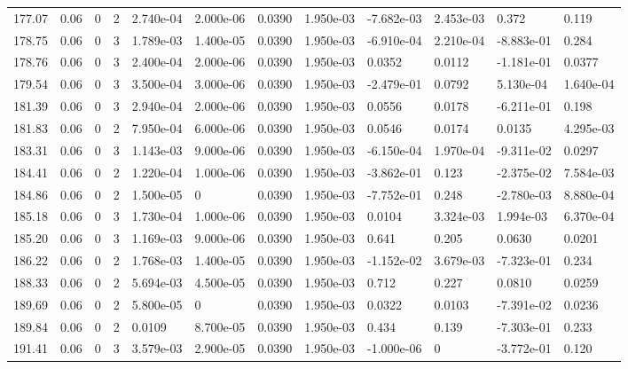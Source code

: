 \documentclass[preview]{standalone}
\begin{document}
{{{{{{{\begin{tabular}{L{1.2cm}C{1.2cm} C{0.3cm}C{0.5cm} C{1.4cm}C{1.4cm} C{1.4cm}C{1.4cm} C{1.6cm}C{1.6cm} C{1.6cm}C{1.6cm}}
  177.07  &  0.06  & 0     &  2 &  2.740e-04  & 2.000e-06  &  0.0390&   1.950e-03& -7.682e-03 & 2.453e-03   &  0.372 & 0.119  \\ 
  178.75  &  0.06  & 0     &  3 &  1.789e-03  & 1.400e-05  &  0.0390&   1.950e-03& -6.910e-04 & 2.210e-04   &  -8.883e-01 & 0.284  \\ 
  178.76  &  0.06  & 0     &  3 &  2.400e-04  & 2.000e-06  &  0.0390&   1.950e-03& 0.0352 & 0.0112   &  -1.181e-01 & 0.0377  \\ 
  179.54  &  0.06  & 0     &  3 &  3.500e-04  & 3.000e-06  &  0.0390&   1.950e-03& -2.479e-01 & 0.0792   &  5.130e-04 & 1.640e-04  \\ 
  181.39  &  0.06  & 0     &  3 &  2.940e-04  & 2.000e-06  &  0.0390&   1.950e-03& 0.0556 & 0.0178   &  -6.211e-01 & 0.198  \\ 
  181.83  &  0.06  & 0     &  2 &  7.950e-04  & 6.000e-06  &  0.0390&   1.950e-03& 0.0546 & 0.0174   &  0.0135 & 4.295e-03  \\ 
  183.31  &  0.06  & 0     &  3 &  1.143e-03  & 9.000e-06  &  0.0390&   1.950e-03& -6.150e-04 & 1.970e-04   &  -9.311e-02 & 0.0297  \\ 
  184.41  &  0.06  & 0     &  2 &  1.220e-04  & 1.000e-06  &  0.0390&   1.950e-03& -3.862e-01 & 0.123   &  -2.375e-02 & 7.584e-03  \\ 
  184.86  &  0.06  & 0     &  2 &  1.500e-05  & 0  &  0.0390&   1.950e-03& -7.752e-01 & 0.248   &  -2.780e-03 & 8.880e-04  \\ 
  185.18  &  0.06  & 0     &  3 &  1.730e-04  & 1.000e-06  &  0.0390&   1.950e-03& 0.0104 & 3.324e-03   &  1.994e-03 & 6.370e-04  \\ 
  185.20  &  0.06  & 0     &  3 &  1.169e-03  & 9.000e-06  &  0.0390&   1.950e-03& 0.641 & 0.205   &  0.0630 & 0.0201  \\ 
  186.22  &  0.06  & 0     &  2 &  1.768e-03  & 1.400e-05  &  0.0390&   1.950e-03& -1.152e-02 & 3.679e-03   &  -7.323e-01 & 0.234  \\ 
  188.33  &  0.06  & 0     &  2 &  5.694e-03  & 4.500e-05  &  0.0390&   1.950e-03& 0.712 & 0.227   &  0.0810 & 0.0259  \\ 
  189.69  &  0.06  & 0     &  2 &  5.800e-05  & 0  &  0.0390&   1.950e-03& 0.0322 & 0.0103   &  -7.391e-02 & 0.0236  \\ 
  189.84  &  0.06  & 0     &  2 &  0.0109  & 8.700e-05  &  0.0390&   1.950e-03& 0.434 & 0.139   &  -7.303e-01 & 0.233  \\ 
  191.41  &  0.06  & 0     &  3 &  3.579e-03  & 2.900e-05  &  0.0390&   1.950e-03& -1.000e-06 & 0   &  -3.772e-01 & 0.120  \\ 

\end{tabular}}}}}}}}
\end{document}
